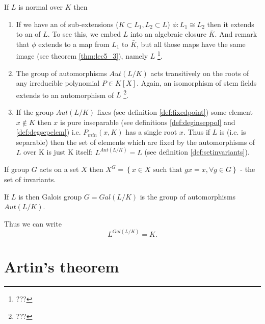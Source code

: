 \begin{remark}
  If $L$ is normal over $K$ then
  \begin{enumerate}
  \item If we have an  of sub-extensions
    ($K \subset L_1, L_2 \subset L$)
    $\phi: L_1 \cong L_2$ then it extends to an
     of $L$.  To see this, we embed $L$ into
    an algebraic closure $\bar{K}$. And remark that $\phi$ extends to a
    map from $L_1$ to $\bar{K}$, but all those maps have the same
    image (see theorem \ref{thm:lec5_3}), namely $L$
    \footnote{
      ???
    }.  
  \item The group of automorphisms $Aut\left(L/K\right)$ acts
    transitively on the roots of any irreducible polynomial $P \in
    K\left[X\right]$. Again, an isomorphism of stem fields extends to
    an automorphism of $L$
    \footnote{
      ???
    }.
  \item If the group $Aut\left(L/K\right)$ fixes (see definition
    \ref{def:fixedpoint}) some element $x 
    \notin K$ then $x$ is pure inseparable (see definitions
    \ref {def:deginseppol} and \ref{def:degsepelem}) i.e.
    $P_{min}\left(x, K\right)$ has a 
    single root $x$. Thus if $L$ is
     (i.e. is separable) then
      the set of elements which are fixed  by the automorphisms  of $L$
      over K is just K itself: 
      $L^{Aut\left(L/K\right)} = L$ (see definition \ref{def:setinvariants}).
  \end{enumerate}
\end{remark}

\begin{definition}
  If group $G$ acts on a set $X$ then $X^G = \left\{x
  \in X \mbox{ such that } gx = x, \forall g \in G\right\}$ - the
  set of invariants.
  \label{def:setinvariants}
\end{definition}

\begin{definition}
  If $L$ is  then Galois group $G =
  Gal\left(L/K\right)$ is the group of automorphisms $Aut\left(L/K\right)$. 
  \label{def:galoisgroup}
\end{definition}

Thus we can write
\begin{equation}
  L^{Gal\left(L/K\right)} = K.
  \label{eq:lec5_2}
\end{equation}

\section{Artin's theorem}

